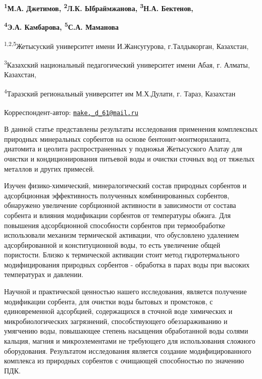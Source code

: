 
\begin{articleheader}

{\bfseries \textsuperscript{1}М.А. Джетимов\textsuperscript{\envelope },
\textsuperscript{2}Л.К. Ыбраймжанова, \textsuperscript{3}Н.А. Бектенов,}

{\bfseries \textsuperscript{4}Э.А. Камбарова, \textsuperscript{5}С.А.
Маманова}
\end{articleheader}

\begin{affiliation}
\textsuperscript{1,2,5}Жетысуский университет имени И.Жансугурова,
г.Талдыкорган, Казахстан,

\textsuperscript{3}Казахский национальный педагогический университет
имени Абая, г. Алматы, Казахстан,

\textsuperscript{4}Таразский региональный университет им М.Х.Дулати, г.
Тараз, Казахстан

\raggedright {\bfseries \textsuperscript{\envelope }}Корреспондент-автор: \href{mailto:make._d_61@mail.ru}{\nolinkurl{make.\_d\_61@mail.ru}}
\end{affiliation}

В данной статье представлены результаты исследования применения
комплексных природных минеральных сорбентов на основе
бентонит-монтмориланита, диатомита и цеолита распространенных у подножья
Жетысуского Алатау для очистки и кондиционирования питьевой воды и
очистки сточных вод от тяжелых металлов и других примесей.

Изучен физико-химический, минералогический состав природных сорбентов и
адсорбционная эффективность полученных комбинированных сорбентов,
обнаружено увеличение сорбционной активности в зависимости от состава
сорбента и влияния модификации сорбентов от температуры обжига. Для
повышения адсорбционной способности сорбентов при термообработке
использовали механизм термической активации, что обусловлено удалением
адсорбированной и конституционной воды, то есть увеличение общей
пористости. Близко к термической активации стоит метод гидротермального
модифицирования природных сорбентов - обработка в парах воды при высоких
температурах и давлении.

Научной и практической ценностью нашего исследования, является получение
модификации сорбента, для очистки воды бытовых и промстоков, с
единовременной адсорбцией, содержащихся в сточной воде химических и
микробиологических загрязнений, способствующего обеззараживанию и
умягчению воды, повышающее степень насыщения обработанной воды солями
кальция, магния и микроэлементами не требующего для использования
сложного оборудования. Результатом исследования является создание
модифицированного комплекса из природных сорбентов с очищающей
способностью по значению ПДК.

